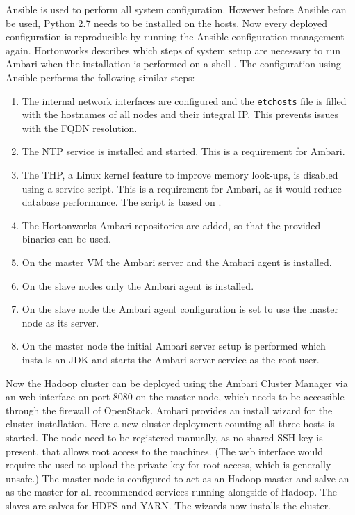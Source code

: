 Ansible is used to perform all system configuration. 
However before Ansible can be used, Python 2.7 needs to be installed on the hosts.
Now every deployed configuration is reproducible by running the Ansible configuration management again.
Hortonworks describes which steps of system setup are necessary 
to run Ambari when the installation is performed on a shell \autocite[][]{hortonworks2018install}.
The configuration using Ansible  performs the following similar steps:
\begin{enumerate}
    \item The internal network interfaces are configured 
        and the \texttt{\/etc\/hosts} file is filled with the hostnames 
        of all nodes and their integral \acs{IP}. 
        This prevents issues with the \ac{FQDN} resolution.
    \item The \ac{NTP} service is installed and started. 
        This is a requirement for Ambari.
    \item The \ac{THP}, a Linux kernel feature to improve memory look-ups, 
        is disabled using a service script. 
        This is a requirement for Ambari, 
        as it would reduce database performance.
        The script is based on \autocite{braun2017hugepages}.
    \item The Hortonworks Ambari repositories are added, so that the provided     binaries can be used.
    \item On the master \ac{VM} the Ambari server 
        and the Ambari agent is installed.
    \item On the slave nodes only the Ambari agent is installed.
    \item On the slave node the Ambari agent configuration is set to use the
        master node as its server.
    \item On the master node the initial Ambari server setup is performed which
        installs an \ac{JDK} 
        and starts the Ambari server service as the root user.
\end{enumerate}

Now the Hadoop cluster can be deployed using the Ambari Cluster Manager 
via an web interface on port 8080 on the master node, 
which needs to be accessible through the firewall of OpenStack.
Ambari provides an install wizard for the cluster installation. 
Here a new cluster deployment counting all three hosts is started.
The node need to be registered manually, as no shared \ac{SSH} key is present, that allows root access to the machines. 
(The web interface would require the used to upload the private key for root access, which is generally unsafe.)
The master node is configured to act as an Hadoop master and salve an as the master for all recommended services running alongside of Hadoop.
The slaves are salves for \ac{HDFS} and \ac{YARN}.
The wizards now installs the cluster.


